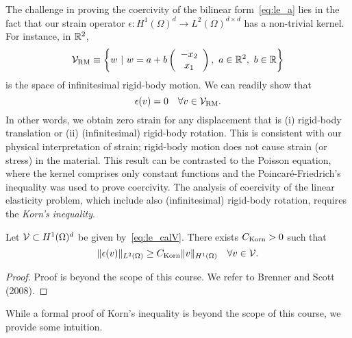 The challenge in proving the coercivity of the bilinear form~\eqref{eq:le_a} lies in the fact that our strain operator $\epsilon: H^1(\Omega)^d \to L^2(\Omega)^{d \times d}$ has a non-trivial kernel. For instance, in $\RR^2$, 
\begin{equation*}
  \calV_{\rm RM} \equiv \left\{ w \ | \ w = a + b \bmat{c} -x_2 \\ x_1 \emat, \ a \in \RR^2, \ b \in \RR \right\}
\end{equation*}
is  the space of infinitesimal rigid-body motion.  We can readily show that
\begin{equation*}
  \epsilon(v) = 0 \quad \forall v \in \calV_{\rm RM}.
\end{equation*}
In other words, we obtain zero strain for any displacement that is (i) rigid-body translation or (ii) (infinitesimal) rigid-body rotation.  This is consistent with our physical interpretation of strain; rigid-body motion does not cause strain (or stress) in the material.  This result can be contrasted to the Poisson equation, where the kernel comprises only constant functions and the Poincar\'e-Friedrich's inequality was used to prove coercivity. The analysis of coercivity of the linear elasticity problem, which include also (infinitesimal) rigid-body rotation, requires the \emph{Korn's inequality}.
\begin{theorem}
  Let $\calV \subset H^1(\Omega)^d$ be given by~\eqref{eq:le_calV}.  There exists $C_{\rm Korn} > 0$ such that
  \begin{equation*}
    \| \epsilon(v) \|_{L^2(\Omega)} \geq C_{\rm Korn} \| v \|_{H^1(\Omega)} \quad \forall v \in \calV.
  \end{equation*}
  \begin{proof}
    Proof is beyond the scope of this course.  We refer to Brenner and Scott (2008).
  \end{proof}
\end{theorem}
While a formal proof of Korn's inequality is beyond the scope of this course, we provide some intuition.  

